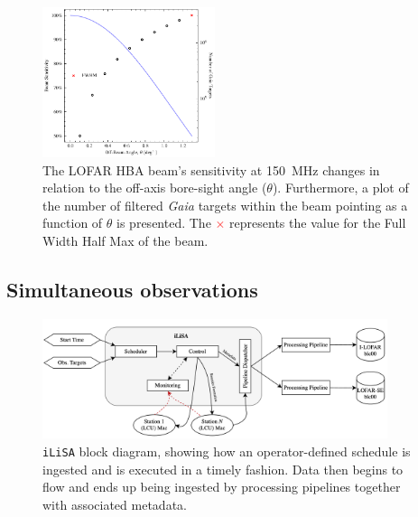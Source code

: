 \begin{figure}
    \centering
    \includegraphics[width = 0.45\textwidth]{SETI/figures/EIRP_plots/off-beam-sensitivity-plots.pdf}
    \caption{The LOFAR HBA beam's sensitivity at 150~MHz changes in relation to the off-axis bore-sight angle ($\theta$). Furthermore, a plot of the number of filtered \textit{Gaia} targets within the beam pointing as a function of $\theta$ is presented. The \textcolor{red}{$\times$} represents the value for the Full Width Half Max of the beam.}
    \label{fig:off_beam_sens}
\end{figure}


\subsection{Simultaneous observations}

\begin{figure}
    \centering
    \includegraphics[width = 0.9\textwidth]{SETI/figures/iLiSA_Block_Diagramv2.png}
    \caption{\texttt{iLiSA} block diagram, showing how an operator-defined schedule is ingested and is executed in a timely fashion. Data then begins to flow and ends up being ingested by processing pipelines together with associated metadata.} %
    \label{fig:iLiSA}
\end{figure}

